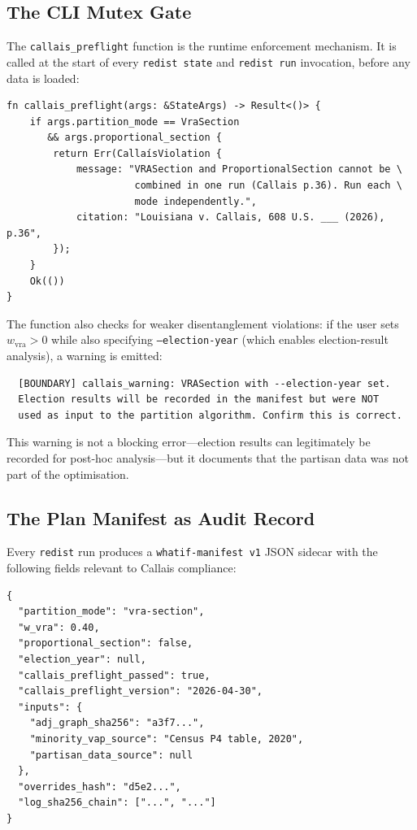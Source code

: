 \subsection{The CLI Mutex Gate}

The \texttt{callais\_preflight} function is the runtime enforcement mechanism.
It is called at the start of every \texttt{redist state} and \texttt{redist run}
invocation, before any data is loaded:

\begin{verbatim}
fn callais_preflight(args: &StateArgs) -> Result<()> {
    if args.partition_mode == VraSection
       && args.proportional_section {
        return Err(CallaísViolation {
            message: "VRASection and ProportionalSection cannot be \
                      combined in one run (Callais p.36). Run each \
                      mode independently.",
            citation: "Louisiana v. Callais, 608 U.S. ___ (2026), p.36",
        });
    }
    Ok(())
}
\end{verbatim}

The function also checks for weaker disentanglement violations: if the user
sets $w_\text{vra} > 0$ while also specifying \texttt{--election-year}
(which enables election-result analysis), a warning is emitted:

\begin{verbatim}
  [BOUNDARY] callais_warning: VRASection with --election-year set.
  Election results will be recorded in the manifest but were NOT
  used as input to the partition algorithm. Confirm this is correct.
\end{verbatim}

This warning is not a blocking error---election results can legitimately be
recorded for post-hoc analysis---but it documents that the partisan data was
not part of the optimisation.

\subsection{The Plan Manifest as Audit Record}

Every \texttt{redist} run produces a \texttt{whatif-manifest v1} JSON sidecar
with the following fields relevant to Callais compliance:

\begin{verbatim}
{
  "partition_mode": "vra-section",
  "w_vra": 0.40,
  "proportional_section": false,
  "election_year": null,
  "callais_preflight_passed": true,
  "callais_preflight_version": "2026-04-30",
  "inputs": {
    "adj_graph_sha256": "a3f7...",
    "minority_vap_source": "Census P4 table, 2020",
    "partisan_data_source": null
  },
  "overrides_hash": "d5e2...",
  "log_sha256_chain": ["...", "..."]
}
\end{verbatim}

